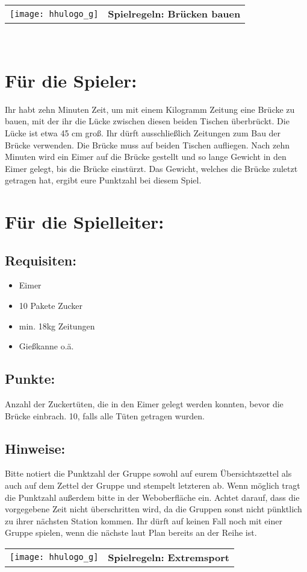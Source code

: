 \documentclass[a4paper,10pt]{article}
\def\spiela{Brücken bauen}
\def\spielb{Extremsport}
\newcommand{\unten}{
 Bitte notiert die Punktzahl der Gruppe sowohl auf eurem Übersichtszettel als auch auf dem Zettel der Gruppe und stempelt letzteren ab. Wenn möglich tragt die Punktzahl außerdem bitte in der Weboberfläche ein.
 Achtet darauf, dass die vorgegebene Zeit nicht überschritten wird, da die Gruppen sonst nicht pünktlich zu ihrer nächsten Station kommen. Ihr dürft auf keinen Fall noch mit einer Gruppe spielen, wenn die nächste laut Plan bereits an der Reihe ist.
}
\begin{document}

  \begin{tabularx}{\textwidth}{lc}
    \texttt{[image: hhulogo\_g]}
  & {\Huge \textbf{Spielregeln: \spiela}}
  \end{tabularx}\\

\Large
\section*{Für die Spieler:} 
Ihr habt zehn Minuten Zeit, um mit einem Kilogramm Zeitung eine Brücke zu bauen, mit der ihr die Lücke zwischen diesen beiden Tischen überbrückt. Die Lücke ist etwa 45 cm groß. Ihr dürft ausschließlich Zeitungen zum Bau der Brücke verwenden. Die Brücke muss auf beiden Tischen aufliegen. Nach zehn Minuten wird ein Eimer auf die Brücke gestellt und so lange Gewicht in den Eimer gelegt, bis die Brücke einstürzt. Das Gewicht, welches die Brücke zuletzt getragen hat, ergibt eure Punktzahl bei diesem Spiel. 

\section*{Für die Spielleiter:}
\subsection*{Requisiten:}
\begin{itemize}
 \item Eimer
 \item 10 Pakete Zucker
 \item min. 18kg Zeitungen
 \item Gießkanne o.ä.
\end{itemize}
\subsection*{Punkte:}
Anzahl der Zuckertüten, die in den Eimer gelegt werden konnten, bevor die Brücke einbrach. 10, falls alle Tüten getragen wurden.

\subsection*{Hinweise:}  
\unten

\newpage


  \begin{tabularx}{\textwidth}{lc}
    \texttt{[image: hhulogo\_g]}
  & {\Huge \textbf{Spielregeln: \spielb}}
  \end{tabularx}\\
\end{document}
